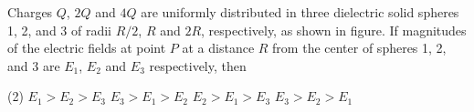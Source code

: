 
\item Charges $Q$, $2Q$ and $4Q$ are uniformly distributed in three dielectric solid spheres 1, 2, and 3 of radii $R/2$, $R$ and $2R$, respectively, as shown in figure. If magnitudes of the electric fields at point $P$ at a distance $R$ from the center of spheres 1, 2, and 3 are $E_1$, $E_2$ and $E_3$ respectively, then
    \begin{center}
    \end{center}
    \begin{tasks}(2)
        \task $E_1>E_2>E_3$
        \task $E_3>E_1>E_2$
        \task $E_2>E_1>E_3$
        \task $E_3>E_2>E_1$
    \end{tasks}
